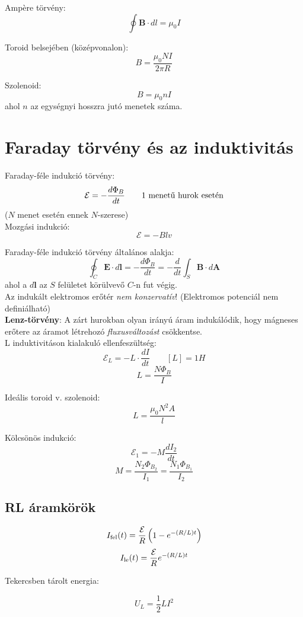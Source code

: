 \documentclass[12pt,a4paper,twocolumn]{article}
\begin{document}
  Ampère törvény:
  \[\oint \mathbf{B}\cdot dl = \mu_0 I\]

  Toroid belsejében (középvonalon):
  \[B = \frac{\mu_0 N I}{2\pi R}\]

  Szolenoid:
  \[B = \mu_0 n I\]
  ahol $n$ az egységnyi hosszra jutó menetek száma.
 
  \section{Faraday törvény és az induktivitás}

  Faraday-féle indukció törvény:
  \[\mathcal{E} = -\frac{d\Phi_B}{dt} \qquad \hbox{1 menetű hurok esetén}\]
  ($N$ menet esetén ennek $N$-szerese)\\

  Mozgási indukció:
  \[\mathcal{E} = -Blv\]

  Faraday-féle indukció törvény általános alakja:
  \[\oint_C \mathbf{E}\cdot d\mathbf{l} = -\frac{d\Phi_B}{dt} = -\frac{d}{dt}\int_S \mathbf{B}\cdot d\mathbf{A}\]
  ahol a $d\mathbf{l}$ az $S$ felületet körülvevő $C$-n fut végig.\\

  Az indukált elektromos erőtér \textit{nem konzervatív}! (Elektromos potenciál nem definiálható)\\

  \textbf{Lenz-törvény}: A zárt hurokban olyan irányú áram indukálódik, hogy mágneses erőtere az áramot létrehozó \textit{fluxusváltozást}
  csökkentse.\\

  L induktivitáson kialakuló ellenfeszültség:
  \[\mathcal{E}_L = -L\cdot \frac{dI}{dt} \qquad [L] = 1H\]
  \[L = \frac{N\Phi_B}{I}\]

  Ideális toroid v. szolenoid:
  \[L = \frac{\mu_0 N^2 A}{l}\]

  Kölcsönös indukció:
  \[\mathcal{E}_1 = -M \frac{dI_2}{dt}\]
  \[M = \frac{N_2\Phi_{B_2}}{I_1} = \frac{N_1\Phi_{B_1}}{I_2}\]

  \subsection{RL áramkörök}

  \[I_{\hbox{\scriptsize fel}}(t) = \frac{\mathcal{E}}{R}\left(1-e^{-(R/L)t}\right)\]
  \[I_{\hbox{\scriptsize le}}(t) = \frac{\mathcal{E}}{R}e^{-(R/L)t}\]

  Tekercsben tárolt energia:

  \[U_L = \frac{1}{2}LI^2\]
\end{document}
